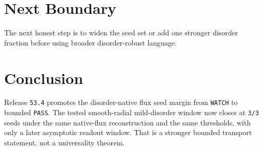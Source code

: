 \documentclass[11pt]{article}
\begin{document}
\section{Next Boundary}

The next honest step is to widen the seed set or add one stronger disorder fraction before using broader disorder-robust language.

\section{Conclusion}

Release \texttt{53.4} promotes the disorder-native flux seed margin from \texttt{WATCH} to bounded \texttt{PASS}. The tested smooth-radial mild-disorder window now closes at \texttt{3/3} seeds under the same native-flux reconstruction and the same thresholds, with only a later asymptotic readout window. That is a stronger bounded transport statement, not a universality theorem.
\end{document}
